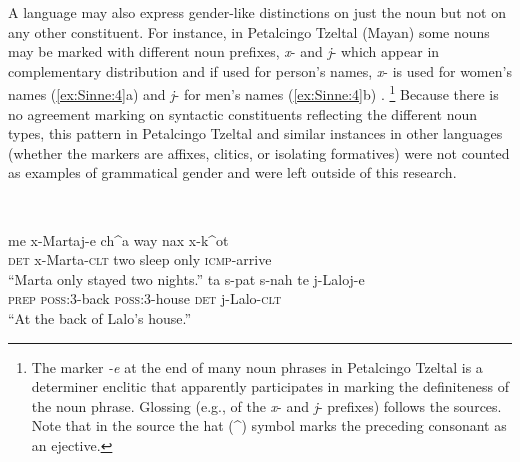 \documentclass[output=collectionpaper]{langsci/langscibook}
\begin{document}
A language may also express gender-like distinctions on just the noun but not on any other constituent. For instance, in Petalcingo Tzeltal (Mayan) some nouns may be marked with different noun prefixes, \textit{x}{}- and \textit{j}{}- which appear in complementary distribution and if used for person's names, \textit{x}{}- is used for women's names (\ref{ex:Sinne:4}a) and \textit{j}{}- for men's names (\ref{ex:Sinne:4}b) \citep[20]{Shklovsky2005}.%
\footnote{The marker \textit{{}-e} at the end of many noun phrases in Petalcingo Tzeltal is a determiner enclitic \citep[127]{Shklovsky2012} that apparently participates in marking the definiteness of the noun phrase. Glossing (e.g., of the \textit{x}{}- and \textit{j}{}- prefixes) follows the sources. Note that in the source the hat (\^{}) symbol marks the preceding consonant as an ejective.} %
Because there is no agreement marking on syntactic constituents reflecting the different noun types, this pattern in Petalcingo Tzeltal and similar instances in other languages (whether the markers are affixes, clitics, or isolating formatives) were not counted as examples of grammatical gender and were left outside of this research.

\ea
\label{ex:Sinne:4}
\\
\begin{xlist}
\ex
\gll me x-Martaj-e ch\^{}a way nax x-k\^{}ot\\
\textsc{det} x{}-Marta-\textsc{clt} two sleep only \textsc{icmp}{}-arrive\\
\glt ``Marta only stayed two nights.''
\ex
\gll ta s-pat s-nah te j-Laloj-e\\
\textsc{prep} \textsc{poss}:3-back \textsc{poss}:3-house \textsc{det} j{}-Lalo-\textsc{clt}\\
\glt ``At the back of Lalo's house.''\\
\end{xlist}
\z
\end{document}
